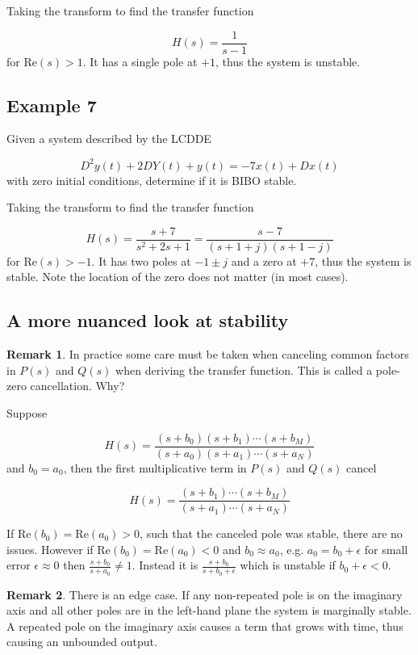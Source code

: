 \documentclass{article}
\begin{document}
Taking the transform to find the transfer function

$$
H(s) = \frac{1}{s-1}
$$
for $\text{Re}(s) > 1$. It has a single pole at $+1$, thus the system is unstable.

\subsection{Example 7}

Given a system described by the LCDDE

$$
D^2 y(t) + 2DY(t) + y(t) = -7 x(t) + Dx(t)
$$
with zero initial conditions, determine if it is BIBO stable.

Taking the transform to find the transfer function

$$
H(s) = \frac{s+7}{s^2 + 2s + 1} = \frac{s-7}{(s + 1 + j)(s + 1 - j)}
$$
for $\text{Re}(s) > -1$. It has two poles at $-1 \pm j$ and a zero at $+7$, thus the system is stable. Note the location of the zero does not matter (in most cases).

\subsection{A more nuanced look at stability}

\textbf{Remark 1}. In practice some care must be taken when canceling common factors in $P(s)$ and $Q(s)$ when deriving the transfer function. This is called a pole-zero cancellation. Why?

Suppose

$$
H(s) = \frac{(s+b_0)(s+b_1)\cdots(s+b_M)}{(s+a_0)(s+a_1)\cdots(s+a_N)}
$$
and $b_0 = a_0$, then the first multiplicative term in $P(s)$ and $Q(s)$ cancel 

$$
H(s) = \frac{(s+b_1)\cdots(s+b_M)}{(s+a_1)\cdots(s+a_N)}
$$

If $\text{Re}(b_0) = \text{Re}(a_0) > 0$, such that the canceled pole was stable, there are no issues. However if $\text{Re}(b_0) = \text{Re}(a_0) < 0$ and $b_0 \approx a_0$, e.g. $a_0 = b_0 + \epsilon$ for small error $\epsilon \approx 0$ then $ \frac{s+b_0}{s+a_0} \neq 1$. Instead it is $\frac{s+b_0}{s+b_0+\epsilon}$ which is unstable if $b_0 + \epsilon < 0$. 


\textbf{Remark 2}. There is an edge case. If any non-repeated pole is on the imaginary axis and all other poles are in the left-hand plane the system is marginally stable. A repeated pole on the imaginary axis causes a term that grows with time, thus causing an unbounded output.
\end{document}
